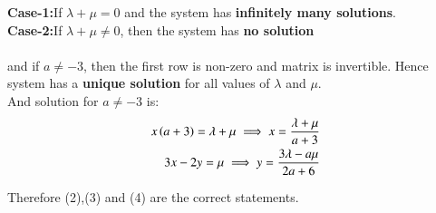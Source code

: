 \documentclass[journal,onecolumn]{IEEEtran}
\begin{document}
\textbf{Case-1:}If $\lambda+\mu=0$ and the system has \textbf{infinitely many solutions}.\\
\textbf{Case-2:}If $\lambda+\mu\neq0$, then the system has \textbf{no solution}\\
\\and if $a\neq-3$, then the first row is non-zero and matrix is invertible. Hence system has a \textbf{unique solution} for all values of $\lambda$ and $\mu$. \\

And solution for $a\neq-3$ is:
\begin{align}
   x\left(a+3\right)=\lambda+\mu \implies x=\frac{\lambda+\mu}{a+3}\\
   3x-2y=\mu \implies y=\frac{3\lambda-a\mu}{2a+6}
 \end{align}

Therefore (2),(3) and (4) are the correct statements.
\end{document}
